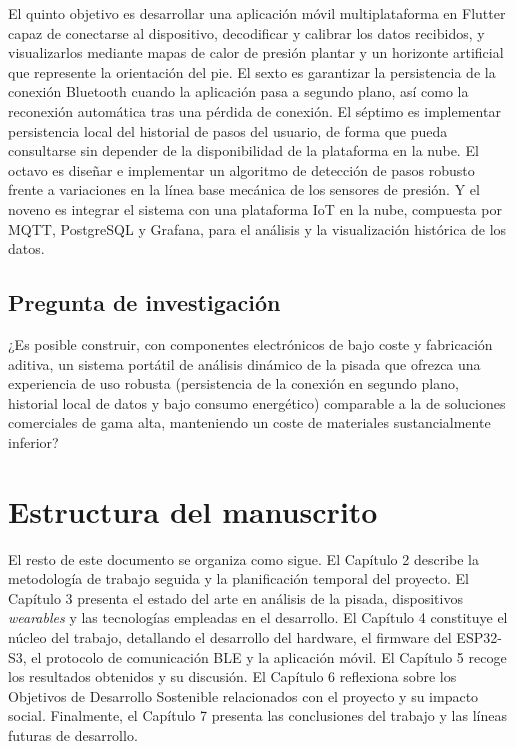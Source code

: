 \begin{IAtext}
El quinto objetivo es desarrollar una aplicación móvil multiplataforma en Flutter capaz de conectarse al dispositivo, decodificar y calibrar los datos recibidos, y visualizarlos mediante mapas de calor de presión plantar y un horizonte artificial que represente la orientación del pie. El sexto es garantizar la persistencia de la conexión Bluetooth cuando la aplicación pasa a segundo plano, así como la reconexión automática tras una pérdida de conexión. El séptimo es implementar persistencia local del historial de pasos del usuario, de forma que pueda consultarse sin depender de la disponibilidad de la plataforma en la nube. El octavo es diseñar e implementar un algoritmo de detección de pasos robusto frente a variaciones en la línea base mecánica de los sensores de presión. Y el noveno es integrar el sistema con una plataforma IoT en la nube, compuesta por MQTT, PostgreSQL y Grafana, para el análisis y la visualización histórica de los datos.

\subsection{Pregunta de investigación}

¿Es posible construir, con componentes electrónicos de bajo coste y fabricación aditiva, un sistema portátil de análisis dinámico de la pisada que ofrezca una experiencia de uso robusta (persistencia de la conexión en segundo plano, historial local de datos y bajo consumo energético) comparable a la de soluciones comerciales de gama alta, manteniendo un coste de materiales sustancialmente inferior?

\section{Estructura del manuscrito}

El resto de este documento se organiza como sigue. El Capítulo 2 describe la metodología de trabajo seguida y la planificación temporal del proyecto. El Capítulo 3 presenta el estado del arte en análisis de la pisada, dispositivos \textit{wearables} y las tecnologías empleadas en el desarrollo. El Capítulo 4 constituye el núcleo del trabajo, detallando el desarrollo del hardware, el firmware del ESP32-S3, el protocolo de comunicación BLE y la aplicación móvil. El Capítulo 5 recoge los resultados obtenidos y su discusión. El Capítulo 6 reflexiona sobre los Objetivos de Desarrollo Sostenible relacionados con el proyecto y su impacto social. Finalmente, el Capítulo 7 presenta las conclusiones del trabajo y las líneas futuras de desarrollo.

\end{IAtext}

